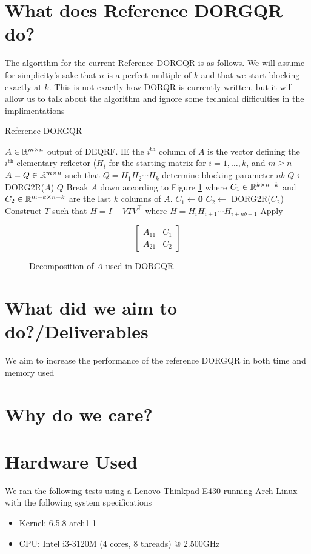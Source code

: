 \documentclass{article}
\begin{document}
\tableofcontents
\section{What does Reference DORGQR do?}
The algorithm for the current Reference DORGQR is as follows. We will assume
for simplicity's sake that $n$ is a perfect multiple of $k$ and that we start
blocking exactly at $k$. This is not exactly how DORQR is currently written, 
but it will allow us to talk about the algorithm and ignore some technical 
difficulties in the implimentations
\begin{algorithm}
    \caption{Reference DORGQR}
    \begin{algorithmic}
        \REQUIRE $A\in\mathbb{R}^{m\times n}$ output of DEQRF. IE the $i^\text{th}$ column of $A$ is the vector defining the $i^\text{th}$ elementary reflector ($H_i$ for the starting matrix for $i=1,\dots,k$, and $m\geq n$
        \ENSURE $A = Q\in\mathbb{R}^{m\times n}$ such that $Q = H_1H_2\cdots H_k$
        \STATE determine blocking parameter $nb$
        \ELSE 
        \STATE $Q \gets$ DORG2R($A$)
        \RETURN $Q$
        \ENDIF
        \STATE Break $A$ down according to Figure \ref{fig:C1C2} where $C_1\in\mathbb{R}^{k\times n-k}$ and $C_2\in\mathbb{R}^{m-k\times n-k}$ are the last $k$ columns of $A$.
        \STATE $C_1 \gets \textbf{0}$
        \STATE $C_2 \gets$ DORG2R($C_2$)
        \STATE Construct $T$ such that $H = I -VTV^\top$ where $H=H_iH_{i+1}\cdots H_{i+nb-1}$ 
        \STATE Apply
        \ENDFOR
    \end{algorithmic}
\end{algorithm}
\begin{figure}
    $$
    \begin{bmatrix}
        A_{11} & C_1 \\
        A_{21} & C_2
    \end{bmatrix}
    $$
    \caption{Decomposition of $A$ used in DORGQR}\label{fig:C1C2}
\end{figure}
\section{What did we aim to do?/Deliverables}
We aim to increase the performance of the reference DORGQR in both time and memory used
\section{Why do we care?}
\section{Hardware Used}
We ran the following tests using a Lenovo Thinkpad E430 running Arch Linux with the following system specifications
\begin{itemize}
    \item Kernel: 6.5.8-arch1-1
    \item CPU: Intel i3-3120M (4 cores, 8 threads) @ 2.500GHz
\end{itemize}
\end{document}
